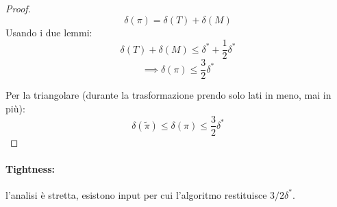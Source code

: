 \documentclass[11pt]{article}
\begin{document}
	\begin{proof}
		$$\delta(\pi) = \delta (T) + \delta(M)$$
		Usando i due lemmi:
		$$ \delta (T) + \delta (M) \leq \delta^\ast + \frac{1}{2} \delta^\ast $$
		$$ \implies \delta (\pi) \leq \frac{3}{2} \delta ^\ast $$
		
		Per la triangolare (durante la trasformazione prendo solo lati in meno, mai in più):
		$$ \delta (\tilde \pi) \leq \delta (\pi) \leq \frac{3}{2} \delta^\ast $$
	\end{proof}
	
	\paragraph{Tightness:} l'analisi è stretta, esistono input per cui l'algoritmo restituisce $3/2 \delta^\ast$.\\
	
\end{document}
